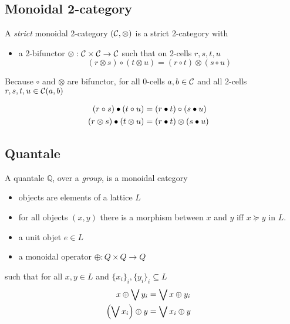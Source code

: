 \documentclass[a4paper]{article}
\begin{document}
\subsection{Monoidal 2-category}

A \emph{strict} monoidal 2-category $({\cal C}, \otimes)$ is a strict 2-category with

\begin{itemize}
\item a 2-bifunctor $\otimes: {\cal C} \times {\cal C} \to {\cal C}$ such that on 2-cells $r, s, t, u$
$$
(r \otimes s) \circ (t \otimes u) = (r \circ t) \otimes (s \circ u)
$$
\end{itemize}

\begin{remark}
Because $\circ$ and $\otimes$ are bifunctor, for all 0-cells $a, b \in {\cal C}$ and all 2-cells $r, s, t, u \in {\cal C}(a, b)$

\begin{align}
(r \circ s) \bullet (t \circ u) &= (r \bullet t) \circ (s \bullet u) \cr
(r \otimes s) \bullet (t \otimes u) &= (r \bullet t) \otimes (s \bullet u)
\end{align}
\end{remark}

\subsection{Quantale}

A quantale $\mathbb{Q}$, over a \emph{group}, is a monoidal category

\begin{itemize}
\item objects are elements of a lattice $L$
\item for all objects $(x, y)$ there is a morphism between $x$ and $y$ iff $x \succeq y$ in $L$.
\item a unit objet $e \in L$
\item a monoidal operator $\oplus: Q \times Q \to Q$
\end{itemize}

\noindent such that for all $x, y \in L$ and $\{x_i\}_i, \{y_i\}_i \subseteq L$
\begin{align}
x \oplus \bigvee y_i &= \bigvee x \oplus y_i \cr
\left(\bigvee x_i\right) \oplus y &= \bigvee x_i \oplus y
\end{align}
\end{document}
